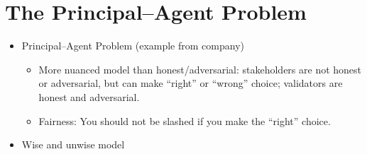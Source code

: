 \section{The Principal--Agent Problem}

\begin{itemize}
    \item Principal--Agent Problem (example from company)
        \begin{itemize}
            \item More nuanced model than honest/adversarial: stakeholders are not honest or adversarial, but can make ``right'' or ``wrong'' choice; validators are honest and adversarial.
            \item Fairness: You should not be slashed if you make the ``right'' choice.
        \end{itemize}
    \item Wise and unwise model
\end{itemize}
